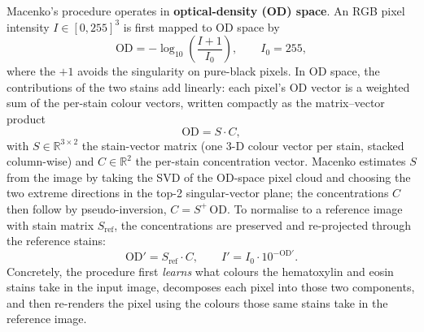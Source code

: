 Macenko's procedure operates in \textbf{optical-density (OD) space}. An RGB pixel intensity $I \in [0, 255]^3$ is first mapped to OD space by
\begin{equation}
\mathrm{OD} = -\log_{10}\!\left(\frac{I + 1}{I_0}\right), \qquad I_0 = 255,
\end{equation}
where the $+1$ avoids the singularity on pure-black pixels. In OD space, the contributions of the two stains add linearly: each pixel's OD vector is a weighted sum of the per-stain colour vectors, written compactly as the matrix--vector product
\begin{equation}
\mathrm{OD} = S \cdot C,
\end{equation}
with $S \in \mathbb{R}^{3 \times 2}$ the stain-vector matrix (one 3-D colour vector per stain, stacked column-wise) and $C \in \mathbb{R}^{2}$ the per-stain concentration vector. Macenko estimates $S$ from the image by taking the SVD of the OD-space pixel cloud and choosing the two extreme directions in the top-2 singular-vector plane; the concentrations $C$ then follow by pseudo-inversion, $C = S^{+}\, \mathrm{OD}$. To normalise to a reference image with stain matrix $S_\mathrm{ref}$, the concentrations are preserved and re-projected through the reference stains:
\begin{equation}
\mathrm{OD}' = S_\mathrm{ref} \cdot C, \qquad I' = I_0 \cdot 10^{-\mathrm{OD}'}.
\end{equation}
Concretely, the procedure first \emph{learns} what colours the hematoxylin and eosin stains take in the input image, decomposes each pixel into those two components, and then re-renders the pixel using the colours those same stains take in the reference image.

